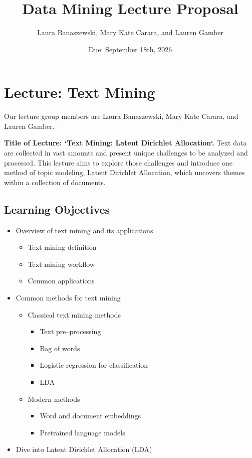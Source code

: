 \documentclass{article}
\title{Data Mining Lecture Proposal}
\author{Laura Banaszewski, Mary Kate Carara, and Lauren Gamber}
\date{Due: September 18th, 2026}
\begin{document}
\maketitle

\section*{Lecture: Text Mining}

Our lecture group members are Laura Banaszewski, Mary Kate Carara, and Lauren Gamber.

\textbf{Title of Lecture: `Text Mining: Latent Dirichlet Allocation`.} Text data are collected in vast amounts and present unique challenges to be analyzed and processed. This lecture aims to explore those challenges and introduce one method of topic modeling, Latent Dirichlet Allocation, which uncovers themes within a collection of documents.  

\subsection*{Learning Objectives}

\begin{itemize}[leftmargin =1.5em]
    \item Overview of text mining and its applications
    \begin{itemize}
        \item Text mining definition
        \item Text mining workflow
        \item Common applications
    \end{itemize}
    \item Common methods for text mining
    \begin{itemize}
        \item Classical text mining methods
        \begin{itemize}
            \item Text pre--processing
            \item Bag of words
            \item Logistic regression for classification
            \item LDA
        \end{itemize}
        \item Modern methods
        \begin{itemize}
            \item Word and document embeddings
            \item Pretrained language models
        \end{itemize}
    \end{itemize}
    \item Dive into Latent Dirichlet Allocation (LDA)
\end{itemize}
\end{document}
